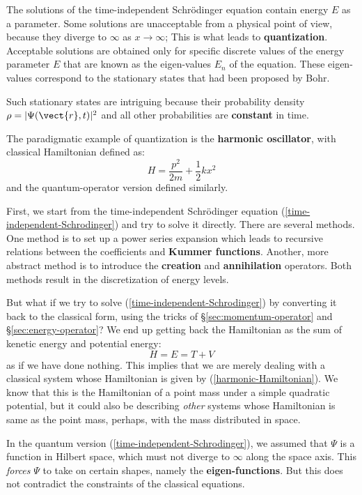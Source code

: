 The solutions of the time-independent Schrödinger equation contain energy $E$ as a parameter. Some solutions are unacceptable from a physical point of view, because they diverge to $\infty$ as $x \rightarrow \infty$;  This is what leads to \textbf{quantization}.  Acceptable solutions are obtained only for specific discrete values of the energy parameter $E$ that are known as the eigen-values $E_n$ of the equation.  These eigen-values correspond to the stationary states that had been proposed by Bohr.

Such stationary states are intriguing because their probability density $\rho = | \Psi(\vect{r}, t) |^2 $ and all other probabilities are \textbf{constant} in time.

The paradigmatic example of quantization is the \textbf{harmonic oscillator}, with classical Hamiltonian defined as:
\begin{equation}
H = \frac{p^2}{2 m} + \frac{1}{2} k x^2
\label{harmonic-Hamiltonian}
\end{equation}
and the quantum-operator version defined similarly.

First, we start from the time-independent Schr\"odinger equation (\ref{time-independent-Schrodinger}) and try to solve it directly.  There are several methods.  One method is to set up a power series expansion which leads to recursive relations between the coefficients and \textbf{Kummer functions}.  Another, more abstract method is to introduce the \textbf{creation} and \textbf{annihilation} operators.  Both methods result in the discretization of energy levels.

But what if we try to solve (\ref{time-independent-Schrodinger}) by converting it back to the classical form, using the tricks of \S\ref{sec:momentum-operator} and \S\ref{sec:energy-operator}?  We end up getting back the Hamiltonian as the sum of kenetic energy and potential energy:
\begin{equation}
H = E = T + V
\end{equation}
as if we have done nothing.  This implies that we are merely dealing with a classical system whose Hamiltonian is given by (\ref{harmonic-Hamiltonian}).  We know that this is the Hamiltonian of a point mass under a simple quadratic potential, but it could also be describing \textit{other} systems whose Hamiltonian is same as the point mass, perhaps, with the mass distributed in space.

In the quantum version (\ref{time-independent-Schrodinger}), we assumed that $\Psi$ is a function in Hilbert space, which must not diverge to $\infty$ along the space axis.  This \textit{forces} $\Psi$ to take on certain shapes, namely the \textbf{eigen-functions}.  But this does not contradict the constraints of the classical equations.

